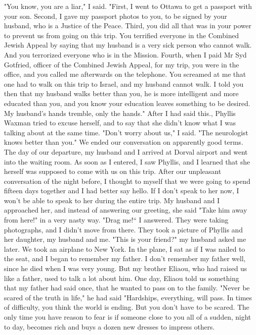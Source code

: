 "You know, you are a liar," I said.
"First, I went to Ottawa to get a passport with your son.
Second, I gave my passport photos to you, to be signed by your husband, who is a Justice of the Peace.
Third, you did all that was in your power to prevent us from going on this trip.
You terrified everyone in the Combined 
Jewish Appeal by saying that my husband is a very sick person who cannot walk.
And you terrorized everyone who is in the Mission.
Fourth, when I paid Mr Syd Gotfried, officer of the Combined Jewish Appeal, for my trip, you were in the office, and you called me afterwards on the telephone.
You screamed at me that one had to  walk on this trip to Israel, and my husband cannot walk.
I told you then that my husband walks better than you, he is more intelligent and more educated than you, and you know your education leaves something to be desired.
My husband's hands tremble, only the hands." 
After I had said this., Phyllis Waxman tried to excuse herself, and to say that she didn't know what I was talking about at the same time.
"Don't worry about us," I said. "The neurologist knows better than you." 
We ended our conversation on apparently good terms. 
The day of our departure, my husband and I arrived at Dorval airport and went into the waiting room.
As soon as I entered, I saw Phyllis, and I learned that she herself was supposed to come with us on this trip.
After our unpleasant conversation of the night before, I thought to myself that we were going to spend fifteen days together and I had better say hello.
If I don't speak to her now, I won't be able to speak to her during the entire trip.
My husband and I approached her, and instead of answering our greeting, she said "Take him away from here!" in a very nasty way. 
"Drag me!“ I answered.
They were taking photographs, and I didn't move from there. 
They took a picture of Phyllis and her daughter, my husband and me. 
"This is your friend?" my husband asked me later. 
We took an airplane to New York. In the plane, I sat as if I was nailed to the seat, and I began to remember my father. 
I don't remember my father well, since he died when I was very young. But my brother Eliaou, who had raised us like a father, used to talk a lot about him.
One day, Eliaou told us something that my father had said once, that he wanted to pass on to the family. 
"Never be scared of the truth in life," he had said "Hardships, everything, will pass.
In times of difficulty, you think the world is ending.
But you don't have to be scared.
The only  time you have reason to fear is if someone close to you all of a sudden, night to day, becomes rich and buys a dozen new dresses to  impress others.
